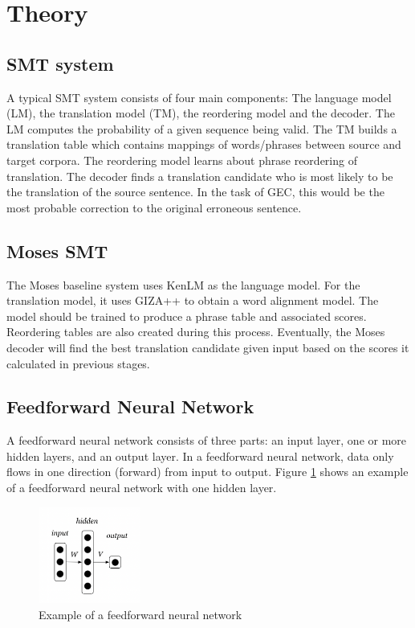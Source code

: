 \documentclass[12pt,a4paper,twoside,openright]{report}
\begin{document}
\section{Theory}

\subsection{SMT system}
A typical SMT system consists of four main components: The language model (LM), the translation model (TM), the reordering model and the decoder\cite{yuan2017phd}. The LM computes the probability of a given sequence being valid. The TM builds a translation table which contains mappings of words/phrases between source and target corpora. The reordering model learns about phrase reordering of translation. The decoder finds a translation candidate who is most likely to be the translation of the source sentence. In the task of GEC, this would be the most probable correction to the original erroneous sentence.



\subsection{Moses SMT}
The Moses baseline system uses KenLM as the language model. For the translation model, it uses GIZA++ to obtain a word alignment model. The model should be trained to produce a phrase table and associated scores. Reordering tables are also created during this process. Eventually, the Moses decoder will find the best translation candidate given input based on the scores it calculated in previous stages.

\subsection{Feedforward Neural Network}
A feedforward neural network consists of three parts: an input layer, one or more hidden layers, and an output layer. In a feedforward neural network, data only flows in one direction (forward) from input to output. Figure \ref{fig:fnn} shows an example of a feedforward neural network with one hidden layer.

\begin{figure}[ht]
\centering
\includegraphics[width=0.3\textwidth]{images/fnn.png}
\caption{Example of a feedforward neural network}
\label{fig:fnn}
\end{figure}
\end{document}
